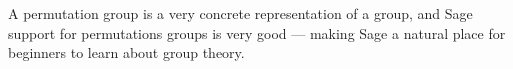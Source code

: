 A permutation group is a very concrete representation of a group, and Sage support for permutations groups is very good --- making Sage a natural place for beginners to learn about group theory.